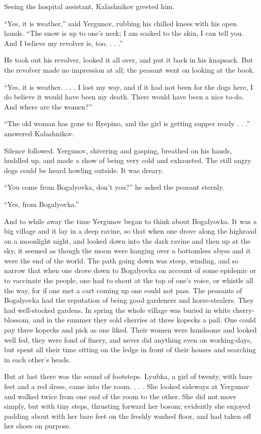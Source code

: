Seeing the hospital assistant, Kalashnikov greeted him.

“Yes, it is weather,” said Yergunov, rubbing his chilled knees with his
open hands. “The snow is up to one’s neck; I am soaked to the skin, I
can tell you. And I believe my revolver is, too. . . .”

He took out his revolver, looked it all over, and put it back in his
knapsack. But the revolver made no impression at all; the peasant went
on looking at the book.

“Yes, it is weather. . . . I lost my way, and if it had not been for the
dogs here, I do believe it would have been my death. There would have
been a nice to-do. And where are the women?”

“The old woman has gone to Ryepino, and the girl is getting supper ready
. . .” answered Kalashnikov.

Silence followed. Yergunov, shivering and gasping, breathed on his
hands, huddled up, and made a show of being very cold and exhausted. The
still angry dogs could be heard howling outside. It was dreary.

“You come from Bogalyovka, don’t you?” he asked the peasant sternly.

“Yes, from Bogalyovka.”

And to while away the time Yergunov began to think about Bogalyovka. It
was a big village and it lay in a deep ravine, so that when one drove
along the highroad on a moonlight night, and looked down into the dark
ravine and then up at the sky, it seemed as though the moon were hanging
over a bottomless abyss and it were the end of the world. The path going
down was steep, winding, and so narrow that when one drove down to
Bogalyovka on account of some epidemic or to vaccinate the people, one
had to shout at the top of one’s voice, or whistle all the way, for if
one met a cart coming up one could not pass. The peasants of Bogalyovka
had the reputation of being good gardeners and horse-stealers. They had
well-stocked gardens. In spring the whole village was buried in white
cherry-blossom, and in the summer they sold cherries at three kopecks a
pail. One could pay three kopecks and pick as one liked. Their women
were handsome and looked well fed, they were fond of finery, and never
did anything even on working-days, but spent all their time sitting on
the ledge in front of their houses and searching in each other’s heads.

But at last there was the sound of footsteps. Lyubka, a girl of twenty,
with bare feet and a red dress, came into the room. . . . She looked
sideways at Yergunov and walked twice from one end of the room to the
other. She did not move simply, but with tiny steps, thrusting forward
her bosom; evidently she enjoyed padding about with her bare feet on the
freshly washed floor, and had taken off her shoes on purpose.

